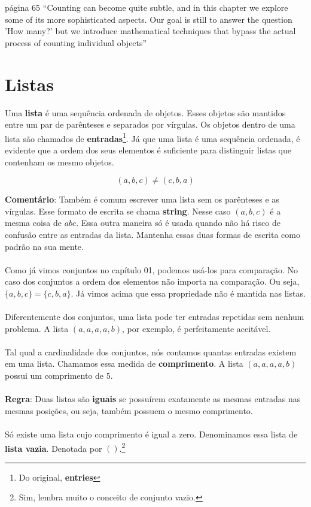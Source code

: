 \documentclass[main.tex]{subfiles}
\begin{document}
\begin{chapquote}{página 65}
	``Counting can become quite subtle, and in this chapter we explore some of its more sophisticated aspects. Our goal is still to answer the question 'How many?' but we introduce mathematical techniques that bypass the actual process of counting individual objects''
\end{chapquote}

\section{Listas}

Uma \textbf{lista} é uma sequência ordenada de objetos. Esses objetos são mantidos entre um par de parênteses e separados por vírgulas. Os objetos dentro de uma lista são chamados de \textbf{entradas}\footnote{Do original, \textbf{entries}}. Já que uma lista é uma sequência ordenada, é evidente que a ordem dos seus elementos é suficiente para distinguir listas que contenham os mesmo objetos.

$$ (a,b,c) \neq (c,b,a) $$

\textbf{Comentário}: Também é comum escrever uma lista sem os parênteses e as vírgulas. Esse formato de escrita se chama \textbf{string}. Nesse caso $(a,b,c)$ é a mesma coisa de $abc$. Essa outra maneira só é usada quando não há risco de confusão entre as entradas da lista. Mantenha essas duas formas de escrita como padrão na sua mente.
\\~\\
Como já vimos conjuntos no capítulo 01, podemos usá-los para comparação. No caso dos conjuntos a ordem dos elementos não importa na comparação. Ou seja, $\{a,b,c\} = \{c,b,a\}$. Já vimos acima que essa propriedade não é mantida nas listas. 
\\~\\
Diferentemente dos conjuntos, uma lista pode ter entradas repetidas sem nenhum problema. A lista $(a,a,a,a,b)$, por exemplo, é perfeitamente aceitável.
\\~\\
Tal qual a cardinalidade dos conjuntos, nós contamos quantas entradas existem em uma lista. Chamamos essa medida de \textbf{comprimento}. A lista $(a,a,a,a,b)$ possui um comprimento de 5.
\\~\\
\textbf{Regra}: Duas listas são \textbf{iguais} se possuírem exatamente as mesmas entradas nas mesmas posições, ou seja, também possuem o mesmo comprimento.
\\~\\
Só existe uma lista cujo comprimento é igual a zero. Denominamos essa lista de \textbf{lista vazia}. Denotada por $()$.\footnote{Sim, lembra muito o conceito de conjunto vazio.}
\end{document}
